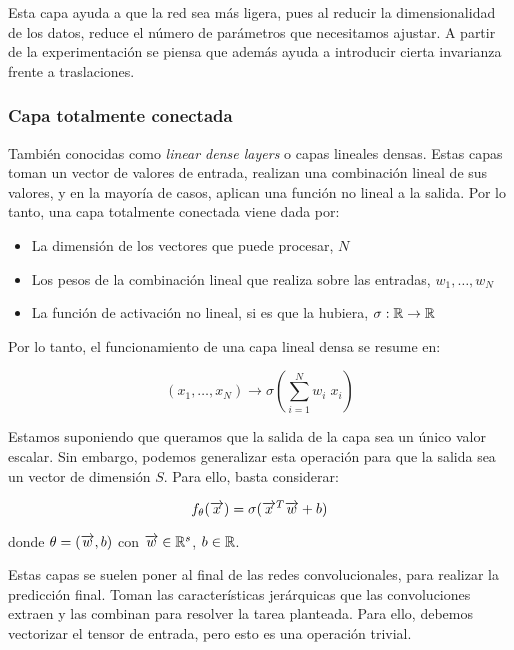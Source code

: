 Esta capa ayuda a que la red sea más ligera, pues al reducir la dimensionalidad de los datos, reduce el número de parámetros que necesitamos ajustar. A partir de la experimentación se piensa que además ayuda a introducir cierta invarianza frente a traslaciones.

\subsubsection{Capa totalmente conectada} \label{subsubs:capa_totalmente_conectada}

También conocidas como \textit{linear dense layers} o capas lineales densas. Estas capas toman un vector de valores de entrada, realizan una combinación lineal de sus valores, y en la mayoría de casos, aplican una función no lineal a la salida. Por lo tanto, una capa totalmente conectada viene dada por:

\begin{itemize}
    \item La dimensión de los vectores que puede procesar, $N$
    \item Los pesos de la combinación lineal que realiza sobre las entradas, $w_1, \ldots, w_N$
    \item La función de activación no lineal, si es que la hubiera, $\sigma: \mathbb{R} \to \mathbb{R}$
\end{itemize}

Por lo tanto, el funcionamiento de una capa lineal densa se resume en:

\begin{equation}
    (x_1, \ldots, x_N) \to \sigma(\sum_{i = 1}^{N} w_i \; x_i)
\end{equation}

Estamos suponiendo que queramos que la salida de la capa sea un único valor escalar. Sin embargo, podemos generalizar esta operación para que la salida sea un vector de dimensión $S$. Para ello, basta considerar:

\begin{equation}
      f_\theta(\overrightarrow{x}) = \sigma(\overrightarrow{x}^T \overrightarrow{w} + b)
\end{equation}

donde $\theta = (\overrightarrow{w}, b)$ con $\overrightarrow{w} \in \mathbb{R}^s$, $b \in \mathbb{R}$.

Estas capas se suelen poner al final de las redes convolucionales, para realizar la predicción final. Toman las características jerárquicas que las convoluciones extraen y las combinan para resolver la tarea planteada. Para ello, debemos vectorizar el tensor de entrada, pero esto es una operación trivial.
